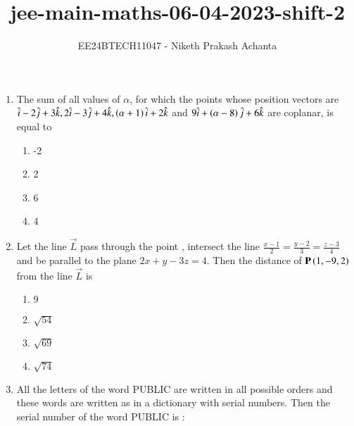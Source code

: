 \documentclass[journal]{IEEEtran}
\renewcommand{\thefigure}{\theenumi}
\renewcommand{\thetable}{\theenumi}
\numberwithin{equation}{enumi}
\numberwithin{figure}{enumi}
\renewcommand{\thetable}{\theenumi}
\begin{document}

\vspace{3cm}

\title{jee-main-maths-06-04-2023-shift-2}
\author{EE24BTECH11047 - Niketh Prakash Achanta}
{\let\newpage\relax\maketitle}
\renewcommand{\thefigure}{\theenumi}
\renewcommand{\thetable}{\theenumi}
\begin{enumerate}[start=16]
    \item The sum of all values of $\alpha$, for which the points whose position vectors are $\hat{i}-2\hat{j}+3\hat{k}, 2\hat{i}-3\hat{j}+4\hat{k}, \left(\alpha+1\right)\hat{i}+2\hat{k}$ and $9\hat{i}+\left(\alpha-8\right)\hat{j}+6\hat{k}$ are coplanar, is equal to 
    \begin{multicols}{4}
    \begin{enumerate}
        \item -2
        \item 2
        \item 6
        \item 4
    \end{enumerate}
    \end{multicols}
    \item Let the line $\vec{L}$ pass through the point , intersect the line $\frac{x-1}{2}=\frac{y-2}{3}=\frac{z-3}{4}$ and be parallel to the plane $2x+y-3z=4$. Then the distance of $\mathbf{P}\left(1,-9,2\right)$ from the line $\vec{L}$ is 
    \begin{multicols}{4}
    \begin{enumerate}
        \item $9$
        \item $\sqrt{54}$
        \item $\sqrt{69}$
        \item $\sqrt{74}$
    \end{enumerate} 
    \end{multicols}
    \item All the letters of the word PUBLIC are written in all possible orders and these words are written as in a dictionary with serial numbers. Then the serial number of the word PUBLIC is :   
    \begin{multicols}{4}

\end{multicols}
\end{enumerate}
\end{document}
